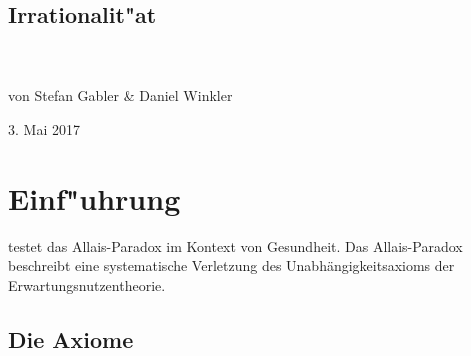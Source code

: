 \documentclass[11pt]{article}
\begin{document}
\thispagestyle{empty}
\begin{center}
  \section*{Irrationalit"at} %
  \textbf{\textcite{oliver2003quantitative}\\}\\
  \large{von Stefan Gabler \& Daniel Winkler}
  
  {\large 3. Mai 2017\par}
\end{center}

\section{Einf"uhrung}
\label{sec:einfuhrung}

\textcite{oliver2003quantitative} testet das Allais-Paradox im Kontext von Gesundheit. Das Allais-Paradox beschreibt eine systematische Verletzung des Unabh\"angigkeitsaxioms der Erwartungsnutzentheorie. 

\subsection{Die Axiome}
\label{sec:die-axiome}
\end{document}
